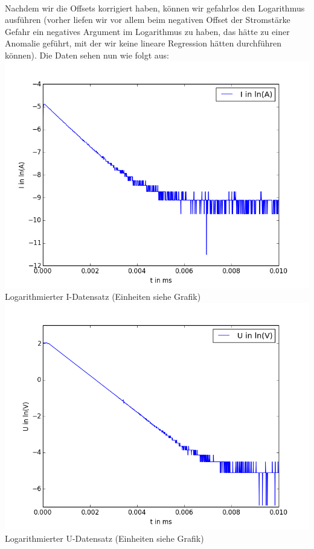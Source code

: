 \documentclass[12pt,a4paper]{article}
\begin{document}
\\Nachdem wir die Offsets korrigiert haben, können wir gefahrlos den Logarithmus ausführen (vorher liefen wir vor allem beim negativen Offset der Stromstärke Gefahr ein negatives Argument im Logarithmus zu haben, das hätte zu einer Anomalie geführt, mit der wir keine lineare Regression hätten durchführen können). Die Daten sehen nun wie folgt aus: \\
\includegraphics[scale=0.35]{ln(I)ggt.png}\\
Logarithmierter I-Datensatz (Einheiten siehe Grafik)\\
\includegraphics[scale=0.35]{ln(u)ggt.png}\\
Logarithmierter U-Datensatz (Einheiten siehe Grafik)\\
\end{document}
